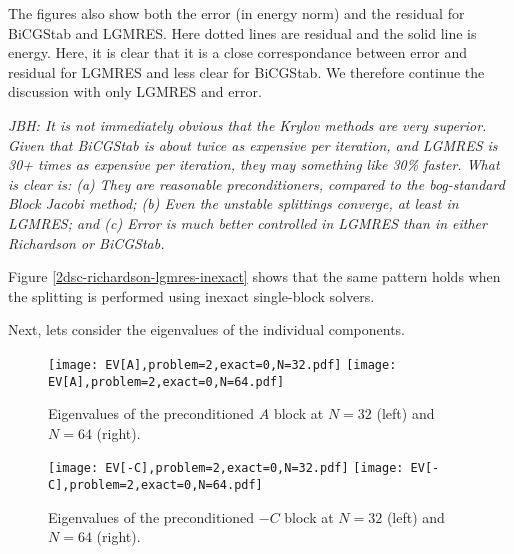 \documentclass{article}
\begin{document}

The figures also show both the error (in energy norm) and the residual for BiCGStab and LGMRES. 
Here dotted lines are residual and the solid line is energy. Here, it is clear that it is a
close correspondance between error and residual for LGMRES and less clear for BiCGStab. We therefore
continue the discussion with only LGMRES and error.


\emph{JBH: It is not immediately obvious that the Krylov methods are very
  superior. Given that BiCGStab is about twice as expensive per iteration, and
  LGMRES is 30+ times as expensive per iteration, they may something like 30\%
  faster. What is clear is: (a) They are reasonable preconditioners, compared
  to the bog-standard Block Jacobi method; (b) Even the unstable splittings
  converge, at least in LGMRES; and (c) Error is much better controlled in
  LGMRES than in either Richardson or BiCGStab.}

Figure \ref{2dsc-richardson-lgmres-inexact} shows that the same pattern holds
when the splitting is performed using inexact single-block solvers.

Next, lets consider the eigenvalues of the individual components. 
\begin{figure}
\begin{center}
\texttt{[image: EV[A],problem=2,exact=0,N=32.pdf]}
\texttt{[image: EV[A],problem=2,exact=0,N=64.pdf]}
\caption{Eigenvalues of the preconditioned $A$ block at $N=32$ (left) and $N=64$ (right).}
\label{evA}
\end{center}
\end{figure}

\begin{figure}
\begin{center}
\texttt{[image: EV[-C],problem=2,exact=0,N=32.pdf]}
\texttt{[image: EV[-C],problem=2,exact=0,N=64.pdf]}
\caption{Eigenvalues of the preconditioned $-C$ block at $N=32$ (left) and $N=64$ (right).}
\label{evC}
\end{center}
\end{figure}
\end{document}
